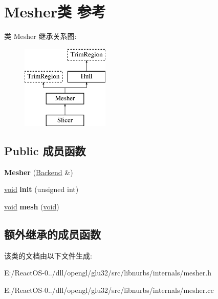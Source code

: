 \hypertarget{class_mesher}{}\section{Mesher类 参考}
\label{class_mesher}
类 Mesher 继承关系图\+:\begin{figure}[H]
\begin{center}
\leavevmode
\includegraphics[height=4.000000cm]{class_mesher}
\end{center}
\end{figure}
\subsection*{Public 成员函数}
\begin{DoxyCompactItemize}
\item 
\mbox{\label{class_mesher_ae8671b62a9139f6fa4dfefd49bec6ba5}} 
{\bfseries Mesher} (\hyperlink{class_backend}{Backend} \&)
\item 
\mbox{\label{class_mesher_a40da40013c1cbac6891f935487955f77}} 
\hyperlink{interfacevoid}{void} {\bfseries init} (unsigned int)
\item 
\mbox{\label{class_mesher_abc9dcde09c24e0a147c6cc18ad601ce1}} 
\hyperlink{interfacevoid}{void} {\bfseries mesh} (\hyperlink{interfacevoid}{void})
\end{DoxyCompactItemize}
\subsection*{额外继承的成员函数}


该类的文档由以下文件生成\+:\begin{DoxyCompactItemize}
\item 
E\+:/\+React\+O\+S-\/0../dll/opengl/glu32/src/libnurbs/internals/mesher.\+h\item 
E\+:/\+React\+O\+S-\/0../dll/opengl/glu32/src/libnurbs/internals/mesher.\+cc\end{DoxyCompactItemize}
